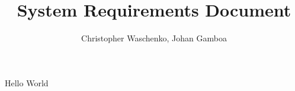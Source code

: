 \documentclass{article}
\begin{document}
\title{System Requirements Document}
\author{Christopher Waschenko, Johan Gamboa}
Hello World
\end{document}
